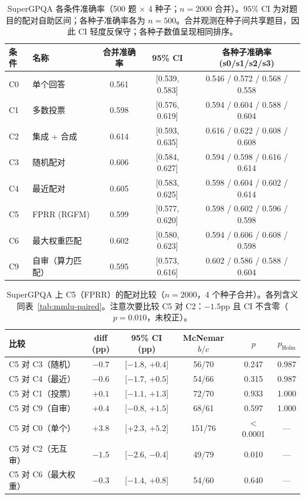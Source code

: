 \documentclass[UTF8,11pt]{ctexart}
\begin{document}
\begin{table}[t]
\centering
\small
\caption{SuperGPQA 各条件准确率（500 题 $\times$ 4 种子；$n=2000$ 合并）。$95\%$ CI 为对题目的配对自助区间；各种子准确率各为 $n=500$。合并观测在种子间共享题目，因此 CI 轻度反保守；各种子数值呈现相同排序。}
\label{tab:sg-acc}
\begin{tabular}{llccc}
\toprule
条件 & 名称 & 合并准确率 & 95\% CI & 各种子准确率 (s0/s1/s2/s3) \\
\midrule
C0 & 单个回答            & 0.561 & [0.539, 0.583] & 0.546 / 0.572 / 0.568 / 0.558 \\
C1 & 多数投票            & 0.598 & [0.576, 0.619] & 0.594 / 0.604 / 0.588 / 0.604 \\
C2 & 集成 + 合成         & 0.614 & [0.593, 0.635] & 0.616 / 0.622 / 0.608 / 0.608 \\
C3 & 随机配对            & 0.606 & [0.584, 0.627] & 0.594 / 0.598 / 0.616 / 0.614 \\
C4 & 最近配对            & 0.605 & [0.583, 0.625] & 0.598 / 0.604 / 0.602 / 0.614 \\
C5 & FPRR (RGFM)         & 0.599 & [0.577, 0.620] & 0.598 / 0.602 / 0.596 / 0.598 \\
C6 & 最大权重匹配        & 0.602 & [0.580, 0.623] & 0.594 / 0.606 / 0.608 / 0.598 \\
C9 & 自审（算力匹配）    & 0.595 & [0.573, 0.616] & 0.602 / 0.586 / 0.588 / 0.604 \\
\bottomrule
\end{tabular}
\end{table}

\begin{table}[t]
\centering
\small
\caption{SuperGPQA 上 C5（FPRR）的配对比较（$n=2000$，4 个种子合并）。各列含义同表~\ref{tab:mmlu-paired}。注意次要比较 C5 对 C2：$-1.5$pp 且 CI 不含零（$p=0.010$，未校正）。}
\label{tab:sg-paired}
\begin{tabular}{lccccc}
\toprule
比较 & diff (pp) & 95\% CI (pp) & McNemar $b/c$ & $p$ & $p_{\mathrm{Holm}}$ \\
\midrule
C5 对 C3（随机）      & $-0.7$ & [$-1.8$, $+0.4$] & 56/70 & 0.247 & 0.987 \\
C5 对 C4（最近）      & $-0.6$ & [$-1.7$, $+0.5$] & 54/66 & 0.315 & 0.987 \\
C5 对 C1（投票）      & $+0.1$ & [$-1.1$, $+1.3$] & 72/70 & 0.933 & 1.000 \\
C5 对 C9（自审）      & $+0.4$ & [$-0.8$, $+1.5$] & 68/61 & 0.597 & 1.000 \\
\midrule
C5 对 C0（单个）      & $+3.8$ & [$+2.3$, $+5.2$] & 151/76 & $<$0.0001 & --- \\
C5 对 C2（无互审）    & $-1.5$ & [$-2.6$, $-0.4$] & 49/79 & 0.010 & --- \\
C5 对 C6（最大权重）  & $-0.3$ & [$-1.4$, $+0.8$] & 54/60 & 0.640 & --- \\
\bottomrule
\end{tabular}
\end{table}
\end{document}

